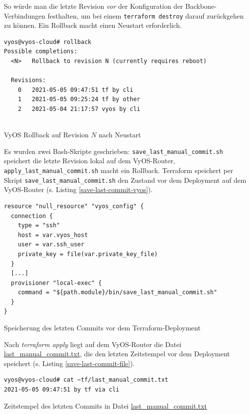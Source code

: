 So würde man die letzte Revision \textit{vor} der Konfiguration der Backbone-Verbindungen festhalten, um bei einem \texttt{terraform destroy} darauf zurückgehen zu können. Ein \gls{Rollback} macht einen Neustart erforderlich.
\begin{listing}[h]
\begin{verbatim}
vyos@vyos-cloud# rollback
Possible completions:
  <N>   Rollback to revision N (currently requires reboot)

  Revisions:
    0   2021-05-05 09:47:51 tf by cli
    1   2021-05-05 09:25:24 tf by other
    2   2021-05-04 21:17:57 vyos by cli
    
\end{verbatim}
\caption{VyOS \gls{Rollback} auf Revision $N$ nach Neustart}
\label{rollback-cmd-vyos}
\end{listing}\FloatBarrier
Es wurden zwei Bash-Skripte geschrieben: \texttt{save\_last\_manual\_commit.sh} speichert die letzte Revision lokal auf dem VyOS-Router, \texttt{apply\_last\_manual\_commit.sh} macht ein \gls{Rollback}. Terraform speichert per Skript \texttt{save\_last\_manual\_commit.sh} den Zustand vor dem \gls{Deployment} auf dem VyOS-Router (s. Listing \ref{save-last-commit-vyos}).
\begin{listing}[h]
\begin{verbatim}
resource "null_resource" "vyos_config" {
  connection {
    type = "ssh"
    host = var.vyos_host
    user = var.ssh_user
    private_key = file(var.private_key_file)
  }
  [...]
  provisioner "local-exec" {
    command = "${path.module}/bin/save_last_manual_commit.sh"
  }
}

\end{verbatim}
\caption{Speicherung des letzten Commits vor dem Terraform-Deployment}
\label{save-last-commit-vyos}
\end{listing}\FloatBarrier
Nach \textit{terraform apply} liegt auf dem VyOS-Router die Datei \underline{last\_manual\_commit.txt}, die den letzten Zeitstempel vor dem Deployment speichert (s. Listing \ref{save-last-commit-file}).
\begin{listing}[h]
\begin{verbatim}
vyos@vyos-cloud# cat ~tf/last_manual_commit.txt
2021-05-05 09:47:51 by tf via cli
\end{verbatim}
\caption{Zeitstempel des letzten Commits in Datei \underline{last\_manual\_commit.txt}}
\label{save-last-commit-file}
\end{listing}\FloatBarrier
